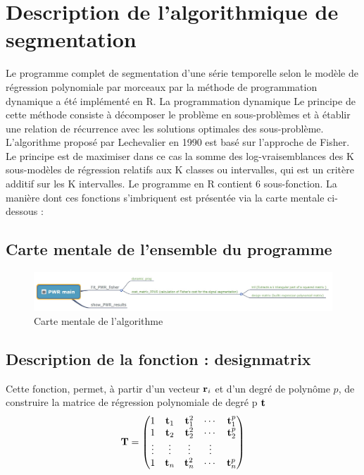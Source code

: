 \documentclass[12pt]{article}
\begin{document}
\section{Description de l'algorithmique de segmentation}
\smallbreak
Le programme complet de segmentation d'une série temporelle selon le modèle de régression polynomiale par morceaux par la méthode de programmation dynamique a été implémenté en R. La programmation dynamique Le principe de cette méthode consiste à décomposer le problème en sous-problèmes et à établir une relation de récurrence avec les solutions optimales des sous-problème. L'algorithme proposé par Lechevalier en 1990 est basé sur l'approche de Fisher. Le principe est de maximiser dans ce cas la somme des log-vraisemblances des K sous-modèles de régression relatifs aux K classes ou intervalles, qui est un critère additif sur les K intervalles. 
Le programme en R contient 6 sous-fonction. La manière dont ces fonctions s'imbriquent est présentée via la carte mentale ci-dessous :
\smallbreak
\subsection{Carte mentale de l'ensemble du programme}
\label{ssec: CM}
\smallbreak
\begin{figure}[H] 
\includegraphics[scale=.6]{mindmapping.jpg}
\caption{\label{fig: mindmapping} Carte mentale de l'algorithme}
\end{figure} 
\smallbreak

\subsection{Description de la fonction : designmatrix }
\label{ssec: ssprog1}
\smallbreak
Cette fonction, permet, à partir d'un vecteur $\mathbf{r}_{i}$ et d'un degré de polynôme $p$, de construire la matrice de régression polynomiale de degré p $\mathbf{t}$
$$
\mathbf{T}=\begin{pmatrix}
   1 & \mathbf{t}_{1} & \mathbf{t}^2_{1} & \cdots & \mathbf{t}^p_{1} \\
   1 & \mathbf{t}_{2} & \mathbf{t}^2_{2} & \cdots & \mathbf{t}^p_{2}  \\
   \vdots & \vdots &\vdots &\vdots\\
   1 & \mathbf{t}_{n} & \mathbf{t}^2_{n} & \cdots & \mathbf{t}^p_{n}  
\end{pmatrix}
$$
\end{document}
